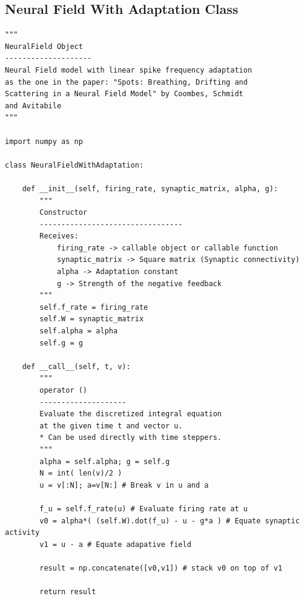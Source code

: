 \documentclass{uonmathreport}
\begin{document}
\subsection{Neural Field With Adaptation Class} \label{app:nf_with_adaptation}
\begin{verbatim}
"""
NeuralField Object
--------------------
Neural Field model with linear spike frequency adaptation
as the one in the paper: "Spots: Breathing, Drifting and 
Scattering in a Neural Field Model" by Coombes, Schmidt
and Avitabile
"""

import numpy as np

class NeuralFieldWithAdaptation:

	def __init__(self, firing_rate, synaptic_matrix, alpha, g):
		"""
		Constructor
		---------------------------------
		Receives:
			firing_rate -> callable object or callable function 
			synaptic_matrix -> Square matrix (Synaptic connectivity)
			alpha -> Adaptation constant
			g -> Strength of the negative feedback
		"""
		self.f_rate = firing_rate
		self.W = synaptic_matrix
		self.alpha = alpha
		self.g = g
	
	def __call__(self, t, v):
		"""
		operator ()
		--------------------
		Evaluate the discretized integral equation
		at the given time t and vector u.
		* Can be used directly with time steppers.
		"""
		alpha = self.alpha; g = self.g
		N = int( len(v)/2 )
		u = v[:N]; a=v[N:] # Break v in u and a
		
		f_u = self.f_rate(u) # Evaluate firing rate at u
		v0 = alpha*( (self.W).dot(f_u) - u - g*a ) # Equate synaptic activity
		v1 = u - a # Equate adapative field
		
		result = np.concatenate([v0,v1]) # stack v0 on top of v1
		
		return result
\end{verbatim}
\end{document}
